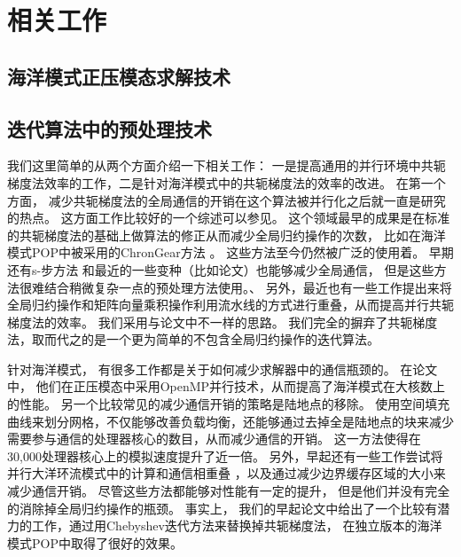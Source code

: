 \chapter{相关工作}
\label{cha:related}

\section{海洋模式正压模态求解技术}
\label{related:baro}
 
\section{迭代算法中的预处理技术}
\label{related:precond}

我们这里简单的从两个方面介绍一下相关工作： 一是提高通用的并行环境中共轭梯度法效率的工作，二是针对海洋模式中的共轭梯度法的效率的改进。
在第一个方面， 减少共轭梯度法的全局通信的开销在这个算法被并行化之后就一直是研究的热点。 
这方面工作比较好的一个综述可以参见\cite{ghysels2014}。 
这个领域最早的成果是在标准的共轭梯度法的基础上做算法的修正从而减少全局归约操作的次数， 比如在海洋模式POP中被采用的ChronGear方法\cite{dAzevedo1999lapack} 。 这些方法至今仍然被广泛的使用着。 
早期还有s-步方法\cite{chron1989} 和最近的一些变种（比如论文）也能够减少全局通信， 但是这些方法很难结合稍微复杂一点的预处理方法使用。、
另外，最近也有一些工作提出来将全局归约操作和矩阵向量乘积操作利用流水线的方式进行重叠\cite{ghysels2014}，从而提高并行共轭梯度法的效率。  
我们采用与论文中不一样的思路。
我们完全的摒弃了共轭梯度法，取而代之的是一个更为简单的不包含全局归约操作的迭代算法。 



针对海洋模式， 有很多工作都是关于如何减少求解器中的通信瓶颈的。 
在论文\cite{Worley:2011:PCE:2063384.2063457}中， 他们在正压模态中采用OpenMP并行技术，从而提高了海洋模式在大核数上的性能。 
另一个比较常见的减少通信开销的策略是陆地点的移除\cite{dennis2007inverse,dennis2008scaling}。 
使用空间填充曲线来划分网格，不仅能够改善负载均衡，还能够通过去掉全是陆地点的块来减少需要参与通信的处理器核心的数目，从而减少通信的开销。 
这一方法使得在30,000处理器核心上的模拟速度提升了近一倍。 
另外，早起还有一些工作尝试将并行大洋环流模式中的计算和通信相重叠 \cite{beare1997optimisation}，以及通过减少边界缓存区域的大小来减少通信开销。 
尽管这些方法都能够对性能有一定的提升， 但是他们并没有完全的消除掉全局归约操作的瓶颈。 
事实上， 我们的早起论文中给出了一个比较有潜力的工作，通过用Chebyshev迭代方法来替换掉共轭梯度法，
在独立版本的海洋模式POP中取得了很好的效果。 


